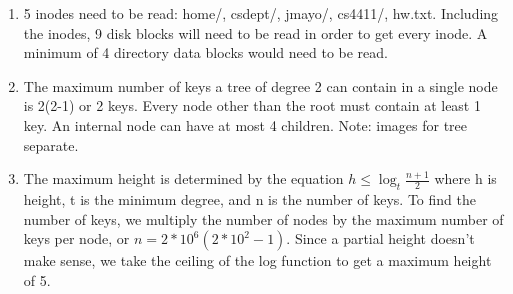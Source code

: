 \documentclass[12pt,letterpaper]{report}
\begin{document}
\begin{enumerate}
\item 5 inodes need to be read: home/, csdept/, jmayo/, cs4411/, hw.txt. Including the 
inodes, 9 disk blocks will need to be read in order to get every inode. A minimum of
4 directory data blocks would need to be read.   

\item The maximum number of keys a tree of degree 2 can contain in a single node is 
2(2-1) or 2 keys. Every node other than the root must contain at least 1 key. An internal
node can have at most 4 children. Note: images for tree separate.

\item The maximum height is determined by the equation $h\leq \log_{t}\frac{n+1}{2}$ where
h is height, t is the minimum degree, and n is the number of keys. To find the number of
keys, we multiply the number of nodes by the maximum number of keys per node, or 
$n = 2*10^6(2*10^2 - 1)$. Since a partial height doesn't make sense, we take the ceiling
of the log function to get a maximum height of 5.  



\end{enumerate}
\end{document}
